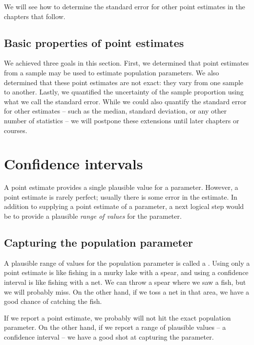 We will see how to determine the standard error for other point estimates in the chapters that follow.  

\subsection{Basic properties of point estimates}

We achieved three goals in this section. First, we determined that point estimates from a sample may be used to estimate population parameters. We also determined that these point estimates are not exact: they vary from one sample to another. Lastly, we quantified the uncertainty of the sample proportion using what we call the standard error.  While we could also quantify the standard error for other estimates -- such as the median, standard deviation, or any other number of statistics -- we will postpone these extensions until later chapters or courses.


\section{Confidence intervals}
\label{ConfidenceIntervals}


A point estimate provides a single plausible value for a parameter. However, a point estimate is rarely perfect; usually there is some error in the estimate. In addition to supplying a point estimate of a parameter, a next logical step would be to provide a plausible \emph{range of values} for the parameter.


\subsection{Capturing the population parameter}

A plausible range of values for the population parameter is called a . Using only a point estimate is like fishing in a murky lake with a spear, and using a confidence interval is like fishing with a net. We can throw a spear where we saw a fish, but we will probably miss. On the other hand, if we toss a net in that area, we have a good chance of catching the fish.

If we report a point estimate, we probably will not hit the exact population parameter. On the other hand, if we report a range of plausible values -- a confidence interval -- we have a good shot at capturing the parameter.

